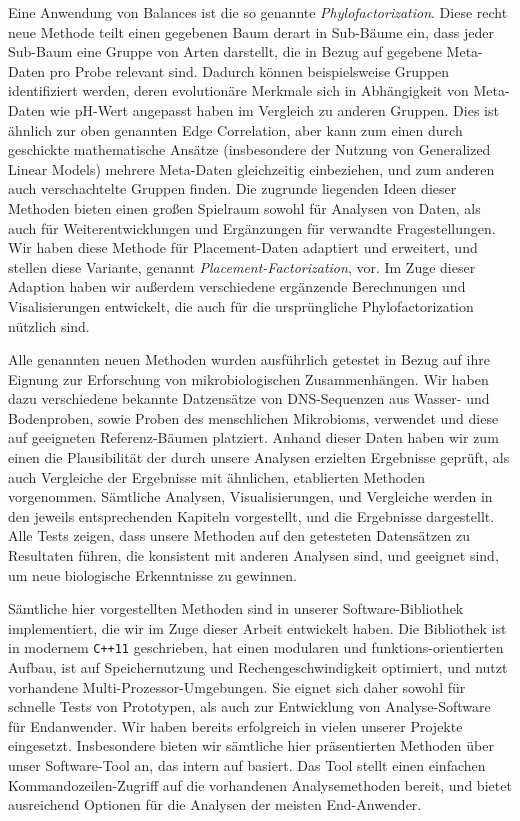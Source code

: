 Eine Anwendung von Balances ist die so genannte \emph{Phylofactorization}.
Diese recht neue Methode teilt einen gegebenen Baum derart in Sub-B\"aume ein,
dass jeder Sub-Baum eine Gruppe von Arten darstellt, die in Bezug auf gegebene Meta-Daten pro Probe relevant sind.
Dadurch k\"onnen beispielsweise Gruppen identifiziert werden,
deren evolution\"are Merkmale sich in Abh\"angigkeit von Meta-Daten wie pH-Wert angepasst haben im Vergleich zu anderen Gruppen.
Dies ist \"ahnlich zur oben genannten Edge Correlation, aber kann zum einen durch geschickte mathematische Ans\"atze
(insbesondere der Nutzung von Generalized Linear Models)
mehrere Meta-Daten gleichzeitig einbeziehen, und zum anderen auch verschachtelte Gruppen finden.
Die zugrunde liegenden Ideen dieser Methoden bieten einen gro\ss{}en Spielraum sowohl f\"ur Analysen von Daten,
als auch f\"ur Weiterentwicklungen und Erg\"anzungen f\"ur verwandte Fragestellungen.
Wir haben diese Methode f\"ur Placement-Daten adaptiert und erweitert,
und stellen diese Variante, genannt \emph{Placement-Factorization}, vor.
Im Zuge dieser Adaption haben wir au\ss{}erdem verschiedene erg\"anzende Berechnungen und Visalisierungen entwickelt,
die auch f\"ur die urspr\"ungliche Phylofactorization n\"utzlich sind.

Alle genannten neuen Methoden wurden ausf\"uhrlich getestet
in Bezug auf ihre Eignung zur Erforschung von mikrobiologischen Zusammenh\"angen.
Wir haben dazu verschiedene bekannte Datzens\"atze von DNS-Sequenzen aus Wasser- und Bodenproben,
sowie Proben des menschlichen Mikrobioms, verwendet und
diese auf geeigneten Referenz-B\"aumen platziert.
Anhand dieser Daten haben wir zum einen die Plausibilit\"at der durch unsere Analysen erzielten Ergebnisse gepr\"uft,
als auch Vergleiche der Ergebnisse mit \"ahnlichen, etablierten Methoden vorgenommen.
S\"amtliche Analysen, Visualisierungen, und Vergleiche werden in den jeweils entsprechenden Kapiteln
vorgestellt, und die Ergebnisse dargestellt.
Alle Tests zeigen, dass unsere Methoden auf den getesteten Datens\"atzen zu Resultaten f\"uhren,
die konsistent mit anderen Analysen sind, und geeignet sind, um neue biologische Erkenntnisse zu gewinnen.

S\"amtliche hier vorgestellten Methoden sind in unserer Software-Bibliothek  implementiert,
die wir im Zuge dieser Arbeit entwickelt haben.
Die Bibliothek ist in modernem \texttt{C++11} geschrieben, hat einen modularen und funktions-orientierten Aufbau,
ist auf Speichernutzung und Rechengeschwindigkeit optimiert, und nutzt vorhandene Multi-Prozessor-Umgebungen.
Sie eignet sich daher sowohl f\"ur schnelle Tests von Prototypen,
als auch zur Entwicklung von Analyse-Software f\"ur Endanwender.
Wir haben  bereits erfolgreich in vielen unserer Projekte eingesetzt.
Insbesondere bieten wir s\"amtliche hier pr\"asentierten Methoden \"uber unser Software-Tool  an,
das intern auf  basiert.
Das Tool stellt einen einfachen Kommandozeilen-Zugriff auf die vorhandenen Analysemethoden bereit,
und bietet ausreichend Optionen f\"ur die Analysen der meisten End-Anwender.


